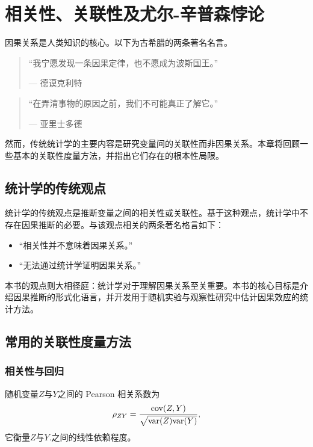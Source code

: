 
\chapter{相关性、关联性及尤尔-辛普森悖论}
 \label{chapter::correlationassociation}
 
 
因果关系是人类知识的核心。以下为古希腊的两条著名名言。 


\begin{quote}
“我宁愿发现一条因果定律，也不愿成为波斯国王。”

--- 德谟克利特 
\end{quote}


\begin{quote}
“在弄清事物的原因之前，我们不可能真正了解它。”

--- 亚里士多德 
\end{quote}
 
 
然而，传统统计学的主要内容是研究变量间的关联性而非因果关系。本章将回顾一些基本的关联性度量方法，并指出它们存在的根本性局限。 
 

\section{统计学的传统观点}

统计学的传统观点是推断变量之间的相关性或关联性。基于这种观点，统计学中不存在因果推断的必要。与该观点相关的两条著名格言如下：

\begin{itemize}
\item
“相关性并不意味着因果关系。”

\item
“无法通过统计学证明因果关系。” 
\end{itemize}

本书的观点则大相径庭：统计学对于理解因果关系至关重要。本书的核心目标是介绍因果推断的形式化语言，并开发用于随机实验与观察性研究中估计因果效应的统计方法。 




 
\section{常用的关联性度量方法}


\subsection{相关性与回归}
\label{section:correlatioandregressionintro}

随机变量$Z$与$Y$之间的 Pearson 相关系数为
$$
\rho_{ZY} = \frac{  \textup{cov}(Z, Y)   }{   \sqrt{   \textup{var}(Z) \textup{var}(Y)   }   } ,
$$
它衡量$Z$与$Y.$之间的线性依赖程度。
 

